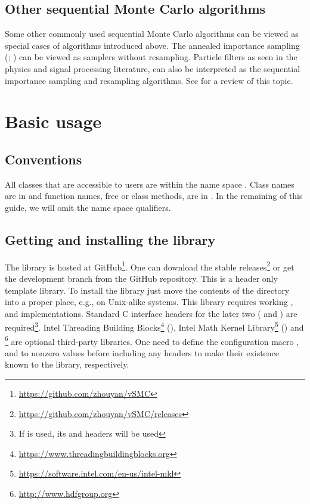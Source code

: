 \documentclass[11pt,bib,mint,hyper,altcolor]{marticle}
\begin{document}
\subsection{Other sequential Monte Carlo algorithms}
\label{sub:Other sequential Monte Carlo algorithms}

Some other commonly used sequential Monte Carlo algorithms can be viewed as
special cases of algorithms introduced above. The annealed importance sampling
(\ais; \textcite{Neal:2001we}) can be viewed as \smc samplers without
resampling. Particle filters as seen in the physics and signal processing
literature, can also be interpreted as the sequential importance sampling and
resampling algorithms. See \textcite{Doucet:2011us} for a review of this topic.

\section{Basic usage}
\label{sec:Basic usage}

\subsection{Conventions}
\label{sub:Conventions}

All classes that are accessible to users are within the name space
. Class names are in  and function names,
free or class methods, are in . In the remaining of this
guide, we will omit the  name space qualifiers.

\subsection{Getting and installing the library}
\label{sub:Getting and installing the library}

The library is hosted at
GitHub\footnote{\url{https://github.com/zhouyan/vSMC}}. One can download the
stable releases\footnote{\url{https://github.com/zhouyan/vSMC/releases}} or get
the development branch from the GitHub repository. This is a header only \cpp
template library. To install the library just move the contents of the
 directory into a proper place, e.g.,
 on Unix-alike systems. This library requires
working \cppoo, \blas and \lapack implementations. Standard C interface headers
for the later two ( and ) are
required\footnote{If \mkl is used, its  and
   headers will be used}. Intel Threading Building
Blocks\footnote{\url{https://www.threadingbuildingblocks.org}} (\tbb), Intel
Math Kernel Library\footnote{\url{https://software.intel.com/en-us/intel-mkl}}
(\mkl) and \hdf\footnote{\url{http://www.hdfgroup.org}} are optional
third-party libraries. One need to define the configuration macro
,  and
 to nonzero values before including any \vsmc headers
to make their existence known to the library, respectively.
\end{document}
